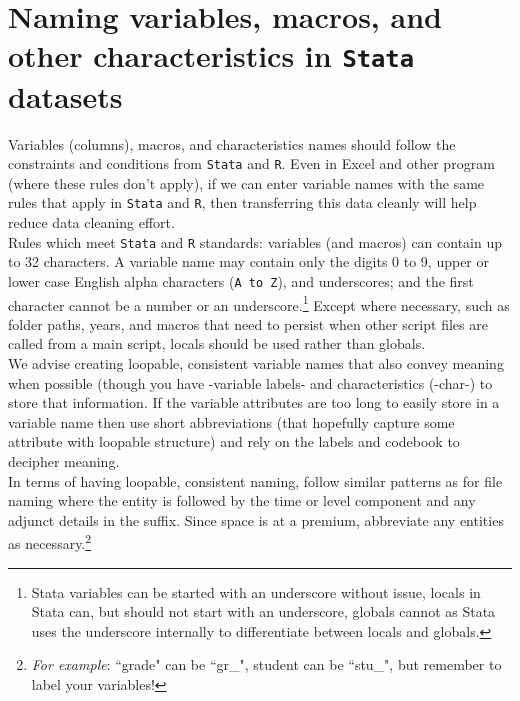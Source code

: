 \section{Naming variables, macros, and other characteristics in \texttt{Stata} datasets} \label{sec:variables}
Variables (columns), macros, and characteristics names should follow the constraints and conditions from \texttt{Stata} and \texttt{R}. Even in Excel and other program (where these rules don't apply), if we can enter variable names with the same rules that apply in \texttt{Stata} and \texttt{R}, then transferring this data cleanly will help reduce data cleaning effort. \\

Rules which meet \texttt{Stata} and \texttt{R} standards:  variables (and macros) can contain up to \textsf{32} characters. A variable name may contain only the digits 0 to 9, upper or lower case English alpha characters (\texttt{A to Z}), and underscores; and the first character cannot be a number or an underscore.\footnote{Stata variables can be started with an underscore without issue, locals in Stata can, but should not start with an underscore, globals cannot as Stata uses the underscore internally to differentiate between locals and globals.} Except where necessary, such as folder paths, years, and macros that need to persist when other script files are called from a main script, locals should be used rather than globals. \\

We advise creating \textsf{loopable}, consistent variable names that also convey meaning when possible (though you have -variable labels- and characteristics (-char-) to store that information. If the variable attributes are too long to easily store in a variable name then use short abbreviations (that hopefully capture some attribute with loopable structure) and rely on the labels and codebook to decipher meaning. \\

In terms of having loopable, consistent naming, follow similar patterns as for file naming where the entity is followed by the time or level component and any adjunct details in the suffix. Since space is at a premium, abbreviate any entities as necessary.\footnote{\textit{For example}: ``grade" can be ``gr\_", student can be ``stu\_", but remember to label your variables!}


